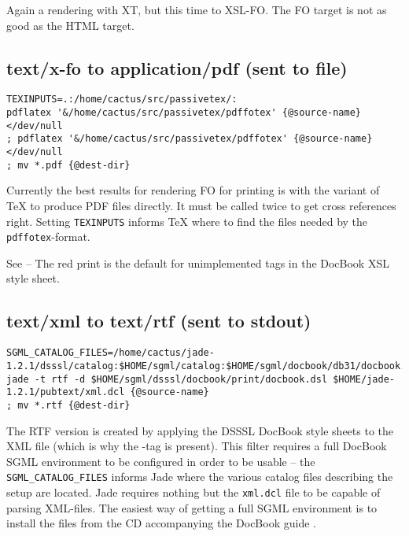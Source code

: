 Again a rendering with XT, but this time to XSL-FO.  The FO target is
not as good as the HTML target.

\subsection*{text/x-fo to application/pdf (sent to file)}
  {\footnotesize
\begin{verbatim}
TEXINPUTS=.:/home/cactus/src/passivetex/: 
pdflatex '&/home/cactus/src/passivetex/pdffotex' {@source-name}</dev/null
; pdflatex '&/home/cactus/src/passivetex/pdffotex' {@source-name}</dev/null
; mv *.pdf {@dest-dir}
\end{verbatim}
}

Currently the best results for rendering FO for printing is
 with the  variant of {\TeX} to produce
PDF files directly.  It must be called twice to get cross references
right.  Setting \texttt{TEXINPUTS} informs {\TeX} where to find the
files needed by the \texttt{pdffotex}-format.


See  -- The red print is
  the default for unimplemented tags in the DocBook XSL style sheet.
  
\subsection*{text/xml to text/rtf (sent to stdout)}
  {\footnotesize
\begin{verbatim}
SGML_CATALOG_FILES=/home/cactus/jade-1.2.1/dsssl/catalog:$HOME/sgml/catalog:$HOME/sgml/docbook/db31/docbook.cat
jade -t rtf -d $HOME/sgml/dsssl/docbook/print/docbook.dsl $HOME/jade-1.2.1/pubtext/xml.dcl {@source-name} 
; mv *.rtf {@dest-dir} 
\end{verbatim} 
}

The RTF version is created by applying the DSSSL DocBook style sheets
to the XML file (which is why the -tag is present).
This filter requires a full DocBook SGML environment to be configured
in order to be usable -- the \texttt{SGML_CATALOG_FILES} informs Jade
where the various catalog files describing the setup are located.
Jade requires nothing but the \texttt{xml.dcl} file to be capable of
parsing XML-files.  The easiest way of getting a full SGML environment
is to install the files from the CD accompanying the DocBook guide
\cite{walsh-muellner:docbook-the-definitive-guide}.

